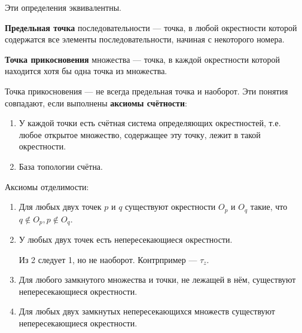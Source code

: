 Эти определения эквивалентны.

\begin{definition}
	\textbf{Предельная точка} последовательности --- точка, в любой окрестности которой содержатся все элементы последовательности, начиная с некоторого номера.
\end{definition}

\begin{definition}
	\textbf{Точка прикосновения} множества --- точка, в каждой окрестности которой находится хотя бы одна точка из множества.
\end{definition}

Точка прикосновения --- не всегда предельная точка и наоборот.
Эти понятия совпадают, если выполнены \textbf{аксиомы счётности}:
\begin{enumerate}
	\item У каждой точки есть счётная система определяющих окрестностей,
	      т.е. любое открытое множество, содержащее эту точку, лежит в такой окрестности.
	\item База топологии счётна.
\end{enumerate}

Аксиомы отделимости:
\begin{enumerate}
	\item Для любых двух точек \(p\) и \(q\) существуют окрестности \(O_p\) и \(O_q\) такие, что \(q \notin O_p, p \notin O_q\).
	\item У любых двух точек есть непересекающиеся окрестности.
	      \begin{remark}
		      Из 2 следует 1, но не наоборот. Контрпример --- \(\tau_z\).
	      \end{remark}
	\item Для любого замкнутого множества и точки, не лежащей в нём, существуют непересекающиеся окрестности.
	\item Для любых двух замкнутых непересекающихся множеств существуют непересекающиеся окрестности.
\end{enumerate}

